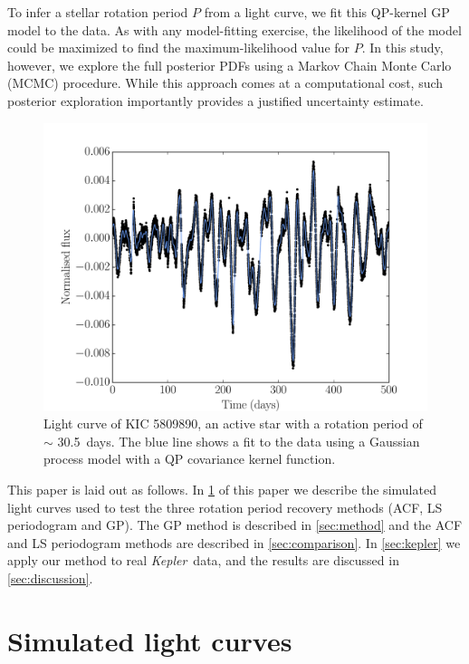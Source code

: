 \documentclass[useAMS, usenatbib, preprint, 12pt]{aastex}
\newcommand{\Kepler}{{\it Kepler}}
\newcommand{\kepler}{\Kepler}
\newcommand{\kepexample}{5809890}
\newcommand{\kepexampleperiod}{30.5}
\begin{document}
To infer a stellar rotation period $P$ from a light curve, we fit this QP-kernel
GP model to the data.  As with any model-fitting exercise, the likelihood
of the model could be maximized to find the maximum-likelihood value for $P$.
In this study, however, we explore the full posterior PDFs using a Markov
Chain Monte Carlo (MCMC) procedure.  While
this approach comes at a computational cost, such posterior exploration
importantly provides a justified uncertainty estimate.

\begin{figure}
\begin{center}
\includegraphics[width=6in, clip=true]{figures/koi_lc_demo.pdf}
\caption[A light curve with a GP model.]
{Light curve of KIC \kepexample, an active star with a rotation period of
$\sim$ \kepexampleperiod\ days.
The blue line shows a fit to the data using a Gaussian process model with a QP
covariance kernel function.}
\label{fig:GP_example}
\end{center}
\end{figure}

This paper is laid out as follows.
In \textsection \ref{sec:simulations} of this paper we describe the simulated
light curves used to test the three rotation period recovery
methods (ACF, LS periodogram and GP).
The GP method is described in \textsection \ref{sec:method} and the ACF and LS
periodogram methods are described in \textsection \ref{sec:comparison}.
In \textsection \ref{sec:kepler} we apply our method to real \kepler\ data,
and the results are discussed in \textsection \ref{sec:discussion}.

\section{Simulated light curves}
\label{sec:simulations}
\end{document}
